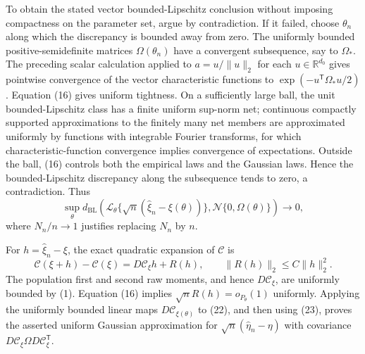To obtain the stated vector bounded-Lipschitz conclusion without imposing compactness on the parameter set, argue by contradiction.  If it failed, choose \(\theta_n\) along which the discrepancy is bounded away from zero.  The uniformly bounded positive-semidefinite matrices \(\Omega(\theta_n)\) have a convergent subsequence, say to \(\Omega_*\).  The preceding scalar calculation applied to \(a=u/\lVert u\rVert_2\) for each \(u\in\mathbb R^{d_0}\) gives pointwise convergence of the vector characteristic functions to \(\exp(-u^{\mathsf T}\Omega_*u/2)\).  Equation (16) gives uniform tightness.  On a sufficiently large ball, the unit bounded-Lipschitz class has a finite uniform sup-norm net; continuous compactly supported approximations to the finitely many net members are approximated uniformly by functions with integrable Fourier transforms, for which characteristic-function convergence implies convergence of expectations.  Outside the ball, (16) controls both the empirical laws and the Gaussian laws.  Hence the bounded-Lipschitz discrepancy along the subsequence tends to zero, a contradiction.  Thus
\[
 \sup_\theta d_{\mathrm{BL}}\left(
 \mathcal L_\theta\{\sqrt n(\widehat\xi_n-\xi(\theta))\},
 \mathcal N\{0,\Omega(\theta)\}\right)\longrightarrow0,
\tag{22}
\]
where \(N_n/n\to1\) justifies replacing \(N_n\) by \(n\).

For \(h=\widehat\xi_n-\xi\), the exact quadratic expansion of \(\mathcal C\) is
\[
 \mathcal C(\xi+h)-\mathcal C(\xi)
 =D\mathcal C_\xi h+R(h),
 \qquad \lVert R(h)\rVert_2\leq C\lVert h\rVert_2^2.
\tag{23}
\]
The population first and second raw moments, and hence \(D\mathcal C_\xi\), are uniformly bounded by (1).  Equation (16) implies \(\sqrt nR(h)=o_{P_\theta}(1)\) uniformly.  Applying the uniformly bounded linear maps \(D\mathcal C_{\xi(\theta)}\) to (22), and then using (23), proves the asserted uniform Gaussian approximation for \(\sqrt n(\widehat\eta_n-\eta)\) with covariance \(D\mathcal C_\xi\Omega D\mathcal C_\xi^{\mathsf T}\).

